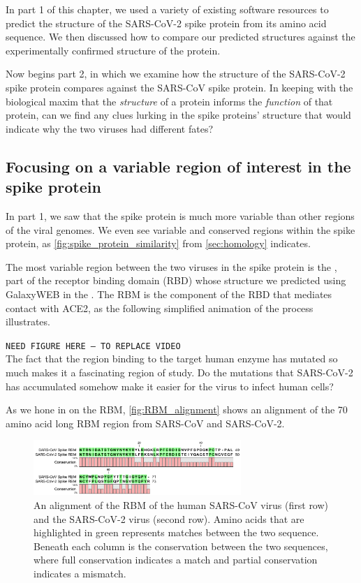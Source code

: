In part 1 of this chapter, we used a variety of existing software resources to predict the structure of the SARS-CoV-2 spike protein from its amino acid sequence. We then discussed how to compare our predicted structures against the experimentally confirmed structure of the protein.

Now begins part 2, in which we examine how the structure of the SARS-CoV-2 spike protein compares against the SARS-CoV spike protein. In keeping with the biological maxim that the \textit{structure} of a protein informs the \textit{function} of that protein, can we find any clues lurking in the spike proteins' structure that would indicate why the two viruses had different fates?

\FloatBarrier
{}
\subsection{Focusing on a variable region of interest in the spike protein}

In part 1, we saw that the spike protein is much more variable than other regions of the viral genomes. We even see variable and conserved regions within the spike protein, as \autoref{fig:spike_protein_similarity} from \autoref{sec:homology} indicates.

The most variable region between the two viruses in the spike protein is the , part of the receptor binding domain (RBD) whose structure we predicted using GalaxyWEB in the . The RBM is the component of the RBD that mediates contact with ACE2, as the following simplified animation of the process illustrates.

\texttt{NEED FIGURE HERE -- TO REPLACE VIDEO}\\

The fact that the region binding to the target human enzyme has mutated so much makes it a fascinating region of study. Do the mutations that SARS-CoV-2 has accumulated somehow make it easier for the virus to infect human cells?

As we hone in on the RBM, \autoref{fig:RBM_alignment} shows an alignment of the 70 amino acid long RBM region from SARS-CoV and SARS-CoV-2.

\begin{figure}[h]
	\centering
	\mySfFamily
	\includegraphics[width = 0.7\textwidth]{../images/RBM_alignment.png}
	\caption{An alignment of the RBM of the human SARS-CoV virus (first row) and the SARS-CoV-2 virus (second row). Amino acids that are highlighted in green represents matches between the two sequence. Beneath each column is the conservation between the two sequences, where full conservation indicates a match and partial conservation indicates a mismatch.}
	\label{fig:RBM_alignment}
\end{figure}

